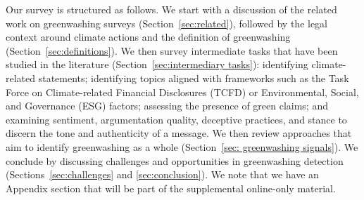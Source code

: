 Our survey is structured as follows. We start with a discussion of the related work on greenwashing surveys (Section~\ref{sec:related}), followed by the legal context around climate actions and the definition of greenwashing (Section~\ref{sec:definitions}). We then survey intermediate tasks that have been studied in the literature (Section~\ref{sec:intermediary tasks}): %
identifying climate-related statements; identifying topics aligned with frameworks such as the Task Force on Climate-related Financial Disclosures (TCFD) or Environmental, Social, and Governance (ESG) factors; assessing the presence of green claims;
and examining sentiment, argumentation quality, deceptive practices, and stance to discern the tone and authenticity of a message. %
We then review approaches that aim to identify greenwashing as a whole %
(Section~\ref{sec: greenwashing signals}). We conclude by discussing challenges and opportunities in greenwashing detection (Sections~\ref{sec:challenges} and \ref{sec:conclusion}). We note that we have an Appendix section that will be part of the supplemental online-only material.

